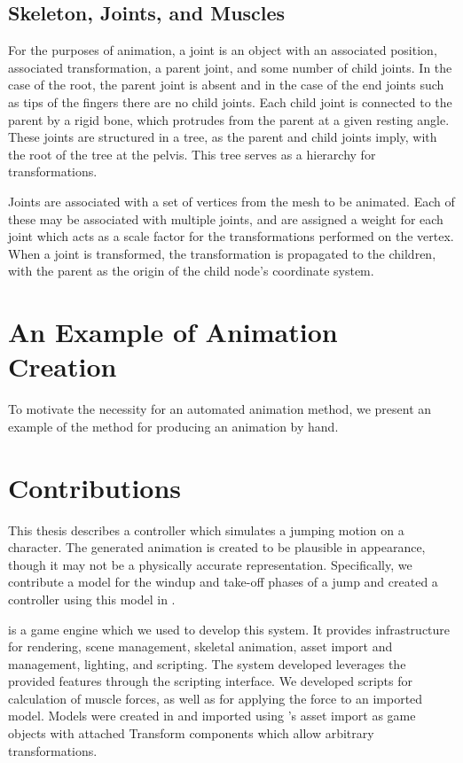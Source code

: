 \subsection{Skeleton, Joints, and Muscles}
\label{subsection:skel_joints}
For the purposes of animation, a joint is an object with an associated position, associated transformation, a parent joint, and some number of child joints.  In the case of the root, the parent joint is absent and in the case of the end joints such as tips of the fingers there are no child joints.  Each child joint is connected to the parent by a rigid bone, which protrudes from the parent at a given resting angle.  These joints are structured in a tree, as the parent and child joints imply, with the root of the tree at the pelvis.  This tree serves as a hierarchy for transformations.

Joints are associated with a set of vertices from the mesh to be animated.  Each of these may be associated with multiple joints, and are assigned a weight for each joint which acts as a scale factor for the transformations performed on the vertex.  When a joint is transformed, the transformation is propagated to the children, with the parent as the origin of the child node's coordinate system.

\section{An Example of Animation Creation}
To motivate the necessity for an automated animation method, we present an example of the method for producing an animation by hand.  

\section{Contributions}
	This thesis describes a controller which simulates a jumping motion on a character.  The generated animation is created to be plausible in appearance, though it may not be a physically accurate representation.  Specifically, we contribute a model for the windup and take-off phases of a jump and created a controller using this model in \unity.

	\unity is a game engine which we used to develop this system.  It provides infrastructure for rendering, scene management, skeletal animation, asset import and management, lighting, and scripting.  The system developed leverages the provided features through the \unity scripting interface.  We developed scripts for calculation of muscle forces, as well as for applying the force to an imported model.  Models were created in \maya and imported using \unity's asset import as \unity game objects with attached Transform components which allow arbitrary transformations.
